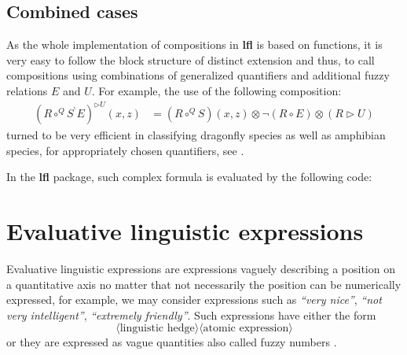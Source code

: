 \documentclass[review]{elsarticle}
\newcommand{\pkg}[1]{\textbf{#1}}
\begin{document}
\subsection{Combined cases}

As the whole implementation of compositions in \pkg{lfl} is based on functions, it is very easy to follow the block structure of distinct extension and thus, to call compositions using combinations of generalized quantifiers and additional fuzzy relations $E$ and $U$. For example, the use of the following composition:
   \begin{align*}
   (R\circ^{Q} S^{\backprime}E)^{\rhd U}(x,z) & = (R\circ^Q S) (x,z) \otimes \neg (R\circ E) \otimes (R\rhd U)  \label{form:circ_Q_excl_unavoid}
\end{align*}
turned to be very efficient in classifying dragonfly species as well as amphibian species, for appropriately chosen quantifiers, see \cite{Step_etal:Unavoidable_KNOSYS2020}.

In the \pkg{lfl} package, such complex formula is evaluated by the following code:
%








\section{Evaluative linguistic expressions}
\label{sec:lingexpr}

Evaluative linguistic expressions \citep{Novak08} are expressions vaguely describing a position on a quantitative axis no matter that not necessarily the position can be numerically expressed, for example, we may consider expressions such as \emph{``very nice''}, \emph{``not very intelligent''}, \emph{``extremely friendly''}. Such expressions have either the form 
$$\langle \textrm{linguistic hedge}\rangle \langle \textrm{atomic expression}\rangle$$
or they are expressed as vague quantities also called fuzzy numbers \citep{Mares}. 
\end{document}
